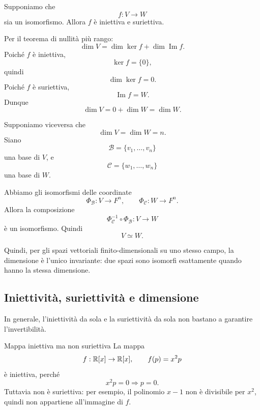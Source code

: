 \documentclass[a4paper]{article}
\begin{document}
\begin{snippetproof}{}
    \begin{iffproof}
    \item Supponiamo che
        \[
            f:V\to W
        \]
        sia un isomorfismo. Allora \(f\) è iniettiva e suriettiva.

        Per il teorema di nullità più rango:
        \[
            \dim V=\dim\ker f+\dim\operatorname{Im}f.
        \]
        Poiché \(f\) è iniettiva,
        \[
            \ker f=\{0\},
        \]
        quindi
        \[
            \dim\ker f=0.
        \]
        Poiché \(f\) è suriettiva,
        \[
            \operatorname{Im}f=W.
        \]
        Dunque
        \[
            \dim V
            =
            0+\dim W
            =
            \dim W.
        \]

    \item Supponiamo viceversa che
        \[
            \dim V=\dim W=n.
        \]
        Siano
        \[
            \mathcal{B}=\{v_1,\ldots,v_n\}
        \]
        una base di \(V\), e
        \[
            \mathcal{C}=\{w_1,\ldots,w_n\}
        \]
        una base di \(W\).

        Abbiamo gli isomorfismi delle coordinate
        \[
            \Phi_{\mathcal{B}}:V\to F^n,
            \qquad
            \Phi_{\mathcal{C}}:W\to F^n.
        \]
        Allora la composizione
        \[
            \Phi_{\mathcal{C}}^{-1}\circ\Phi_{\mathcal{B}}:V\to W
        \]
        è un isomorfismo. Quindi
        \[
            V\simeq W.
        \]
    \end{iffproof}
\end{snippetproof}

Quindi, per gli spazi vettoriali finito-dimensionali su uno stesso campo, la dimensione è l'unico invariante: due spazi sono isomorfi esattamente quando hanno la stessa dimensione.

\subsection{Iniettività, suriettività e dimensione}

In generale, l'iniettività da sola e la suriettività da sola non bastano a garantire l'invertibilità.

\begin{snippetexample}{Mappa iniettiva ma non suriettiva}
    La mappa
    \[
        f:\mathbb{R}[x]\to\mathbb{R}[x],
        \qquad
        f(p)=x^2p
    \]
    è iniettiva, perché
    \[
        x^2p=0
        \Longrightarrow
        p=0.
    \]
    Tuttavia non è suriettiva: per esempio, il polinomio \(x-1\) non è divisibile per \(x^2\), quindi non appartiene all'immagine di \(f\).
\end{snippetexample}
\end{document}
